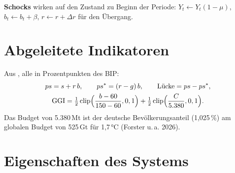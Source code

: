 \textbf{Schocks} wirken auf den Zustand zu Beginn der Periode: $Y_t\leftarrow Y_t(1-\mu)$,
$b_t\leftarrow b_t+\beta$, $r\leftarrow r+\Delta r$ für den Übergang.

\section{Abgeleitete Indikatoren}

Aus , alle in Prozentpunkten des BIP:
\begin{gather}
ps=s+r\,b,\qquad ps^*=(r-g)\,b,\qquad \text{Lücke}=ps-ps^*,\\
\text{GGI}=\tfrac12\operatorname{clip}\Bigl(\frac{b-60}{150-60},0,1\Bigr)+\tfrac12\operatorname{clip}\Bigl(\frac{C}{5.380},0,1\Bigr).
\end{gather}
Das Budget von 5.380\,Mt ist der deutsche Bevölkerungsanteil (1,025\,\%) am globalen Budget
von 525\,Gt für 1,7\,°C (Forster u.\,a. 2026).

\section{Eigenschaften des Systems}
\label{sec:eigenschaften}

